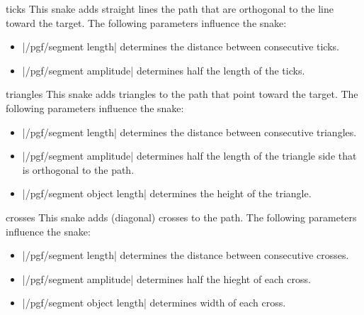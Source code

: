 \begin{snake}{ticks}
  This snake adds straight lines  the path that are orthogonal to the
  line toward the target. The following parameters influence the snake: 
  \begin{itemize}
  \item |/pgf/segment length|
    determines the distance between consecutive ticks.
  \item |/pgf/segment amplitude|
    determines half the length of the ticks.
  \end{itemize}
\begin{codeexample}[]
\end{codeexample}
\end{snake}

\begin{snake}{triangles}
  This snake adds triangles to the path that point toward the
  target. The following parameters influence the snake: 
  \begin{itemize}
  \item |/pgf/segment length|
    determines the distance between consecutive triangles.
  \item |/pgf/segment amplitude|
    determines half the length of the triangle side that is orthogonal
    to the path.
  \item |/pgf/segment object length|
    determines the height of the triangle.
  \end{itemize}
\begin{codeexample}[]
\end{codeexample}
\end{snake}

\begin{snake}{crosses}
  This snake adds (diagonal) crosses to the path. The following
  parameters influence the snake:  
  \begin{itemize}
  \item |/pgf/segment length|
    determines the distance between consecutive crosses.
  \item |/pgf/segment amplitude|
    determines half the hieght of each cross.
  \item |/pgf/segment object length|
    determines width of each cross.
  \end{itemize}
\begin{codeexample}[]
\end{codeexample}
\end{snake}


